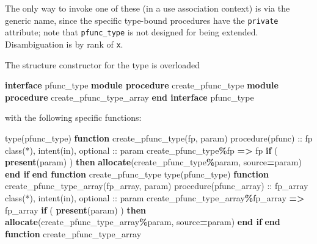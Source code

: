\documentclass[
  paper=a4,
  ,captions=tableheading
]{scrartcl}
\newenvironment{Shaded}{\begin{snugshade}}{\end{snugshade}}
\newcommand{\DataTypeTok}[1]{\textcolor[rgb]{0.13,0.29,0.53}{#1}}
\newcommand{\FunctionTok}[1]{\textcolor[rgb]{0.13,0.29,0.53}{\textbf{#1}}}
\newcommand{\KeywordTok}[1]{\textcolor[rgb]{0.13,0.29,0.53}{\textbf{#1}}}
\newcommand{\NormalTok}[1]{#1}
\newcommand{\OperatorTok}[1]{\textcolor[rgb]{0.81,0.36,0.00}{\textbf{#1}}}
\begin{document}
The only way to invoke one of these (in a use association context) is
via the generic name, since the specific type-bound procedures have the
\texttt{private} attribute; note that \texttt{pfunc\_type} is not
designed for being extended. Disambiguation is by rank of \texttt{x}.

The structure constructor for the type is overloaded

\begin{Shaded}
\begin{Highlighting}[]
\KeywordTok{interface}\NormalTok{ pfunc\_type}
  \KeywordTok{module procedure}\NormalTok{ create\_pfunc\_type}
  \KeywordTok{module procedure}\NormalTok{ create\_pfunc\_type\_array}
\KeywordTok{end interface}\NormalTok{ pfunc\_type}
\end{Highlighting}
\end{Shaded}

with the following specific functions:

\begin{Shaded}
\begin{Highlighting}[]
\DataTypeTok{type(pfunc\_type)} \KeywordTok{function}\NormalTok{ create\_pfunc\_type(fp, param)}
  \DataTypeTok{procedure(pfunc)} \DataTypeTok{::}\NormalTok{ fp}
  \DataTypeTok{class(*)}\NormalTok{, }\DataTypeTok{intent(in)}\NormalTok{, }\DataTypeTok{optional} \DataTypeTok{::}\NormalTok{ param}
\NormalTok{  create\_pfunc\_type}\OperatorTok{\%}\NormalTok{fp }\KeywordTok{=}\OperatorTok{\textgreater{}}\NormalTok{ fp}
  \KeywordTok{if}\NormalTok{ ( }\FunctionTok{present}\NormalTok{(param) ) }\KeywordTok{then}
    \KeywordTok{allocate}\NormalTok{(create\_pfunc\_type}\OperatorTok{\%}\NormalTok{param, source}\KeywordTok{=}\NormalTok{param)}
  \KeywordTok{end if}
\KeywordTok{end function}\NormalTok{ create\_pfunc\_type}
\DataTypeTok{type(pfunc\_type)} \KeywordTok{function}\NormalTok{ create\_pfunc\_type\_array(fp\_array, param)}
  \DataTypeTok{procedure(pfunc\_array)} \DataTypeTok{::}\NormalTok{ fp\_array}
  \DataTypeTok{class(*)}\NormalTok{, }\DataTypeTok{intent(in)}\NormalTok{, }\DataTypeTok{optional} \DataTypeTok{::}\NormalTok{ param}
\NormalTok{  create\_pfunc\_type\_array}\OperatorTok{\%}\NormalTok{fp\_array }\KeywordTok{=}\OperatorTok{\textgreater{}}\NormalTok{ fp\_array}
  \KeywordTok{if}\NormalTok{ ( }\FunctionTok{present}\NormalTok{(param) ) }\KeywordTok{then}
    \KeywordTok{allocate}\NormalTok{(create\_pfunc\_type\_array}\OperatorTok{\%}\NormalTok{param, source}\KeywordTok{=}\NormalTok{param)}
  \KeywordTok{end if}
\KeywordTok{end function}\NormalTok{ create\_pfunc\_type\_array}
\end{Highlighting}
\end{Shaded}
\end{document}
